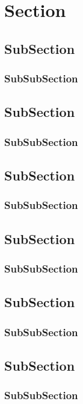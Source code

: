 \section{Section}

\subsection{SubSection}
\subsubsection{SubSubSection}

\subsection{SubSection}
\subsubsection{SubSubSection}

\subsection{SubSection}
\subsubsection{SubSubSection}

\subsection{SubSection}
\subsubsection{SubSubSection}

\subsection{SubSection}
\subsubsection{SubSubSection}

\subsection{SubSection}
\subsubsection{SubSubSection}

